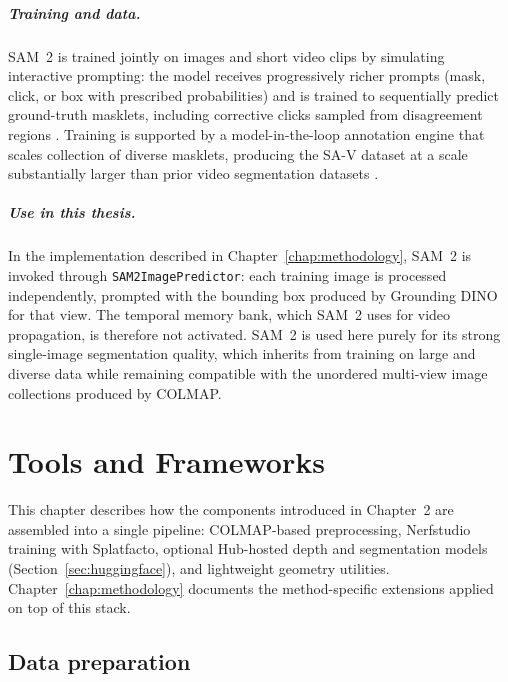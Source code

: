 \documentclass{report}
\begin{document}
\paragraph{Training and data.}
SAM~2 is trained jointly on images and short video clips by simulating interactive prompting: the model receives progressively richer prompts (mask, click, or box with prescribed probabilities) and is trained to sequentially predict ground-truth masklets, including corrective clicks sampled from disagreement regions \cite{ravi2024sam2}. Training is supported by a model-in-the-loop annotation engine that scales collection of diverse masklets, producing the SA-V dataset at a scale substantially larger than prior video segmentation datasets \cite{ravi2024sam2}.

\paragraph{Use in this thesis.}
In the implementation described in Chapter~\ref{chap:methodology}, SAM~2 is invoked through \texttt{SAM2ImagePredictor}: each training image is processed independently, prompted with the bounding box produced by Grounding DINO for that view. The temporal memory bank, which SAM~2 uses for video propagation, is therefore not activated. SAM~2 is used here purely for its strong single-image segmentation quality, which inherits from training on large and diverse data while remaining compatible with the unordered multi-view image collections produced by COLMAP.

\chapter{Tools and Frameworks}
\label{chap:tools}

This chapter describes how the components introduced in Chapter~2 are assembled into a single pipeline: COLMAP-based preprocessing, Nerfstudio training with Splatfacto, optional Hub-hosted depth and segmentation models (Section~\ref{sec:huggingface}), and lightweight geometry utilities. Chapter~\ref{chap:methodology} documents the method-specific extensions applied on top of this stack.

\section{Data preparation}
\label{sec:data_preparation}
\end{document}

